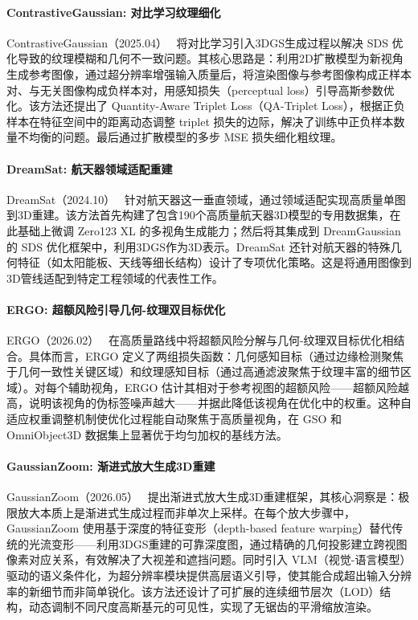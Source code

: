 \paragraph{ContrastiveGaussian: 对比学习纹理细化}

ContrastiveGaussian（2025.04）~\cite{2504_08100} 将对比学习引入3DGS生成过程以解决 SDS 优化导致的纹理模糊和几何不一致问题。其核心思路是：利用2D扩散模型为新视角生成参考图像，通过超分辨率增强输入质量后，将渲染图像与参考图像构成正样本对、与无关图像构成负样本对，用感知损失（perceptual loss）引导高斯参数优化。该方法还提出了 Quantity-Aware Triplet Loss（QA-Triplet Loss），根据正负样本在特征空间中的距离动态调整 triplet 损失的边际，解决了训练中正负样本数量不均衡的问题。最后通过扩散模型的多步 MSE 损失细化粗纹理。

\paragraph{DreamSat: 航天器领域适配重建}

DreamSat（2024.10）~\cite{2410_05097} 针对航天器这一垂直领域，通过领域适配实现高质量单图到3D重建。该方法首先构建了包含190个高质量航天器3D模型的专用数据集，在此基础上微调 Zero123 XL 的多视角生成能力；然后将其集成到 DreamGaussian 的 SDS 优化框架中，利用3DGS作为3D表示。DreamSat 还针对航天器的特殊几何特征（如太阳能板、天线等细长结构）设计了专项优化策略。这是将通用图像到3D管线适配到特定工程领域的代表性工作。

\paragraph{ERGO: 超额风险引导几何-纹理双目标优化}

ERGO（2026.02）~\cite{2602_10278} 在高质量路线中将超额风险分解与几何-纹理双目标优化相结合。具体而言，ERGO 定义了两组损失函数：几何感知目标（通过边缘检测聚焦于几何一致性关键区域）和纹理感知目标（通过高通滤波聚焦于纹理丰富的细节区域）。对每个辅助视角，ERGO 估计其相对于参考视图的超额风险——超额风险越高，说明该视角的伪标签噪声越大——并据此降低该视角在优化中的权重。这种自适应权重调整机制使优化过程能自动聚焦于高质量视角，在 GSO 和 OmniObject3D 数据集上显著优于均匀加权的基线方法。

\paragraph{GaussianZoom: 渐进式放大生成3D重建}

GaussianZoom（2026.05）~\cite{2605_18252} 提出渐进式放大生成3D重建框架，其核心洞察是：极限放大本质上是渐进式生成过程而非单次上采样。在每个放大步骤中，GaussianZoom 使用基于深度的特征变形（depth-based feature warping）替代传统的光流变形——利用3DGS重建的可靠深度图，通过精确的几何投影建立跨视图像素对应关系，有效解决了大视差和遮挡问题。同时引入 VLM（视觉-语言模型）驱动的语义条件化，为超分辨率模块提供高层语义引导，使其能合成超出输入分辨率的新细节而非简单锐化。该方法还设计了可扩展的连续细节层次（LOD）结构，动态调制不同尺度高斯基元的可见性，实现了无锯齿的平滑缩放渲染。

